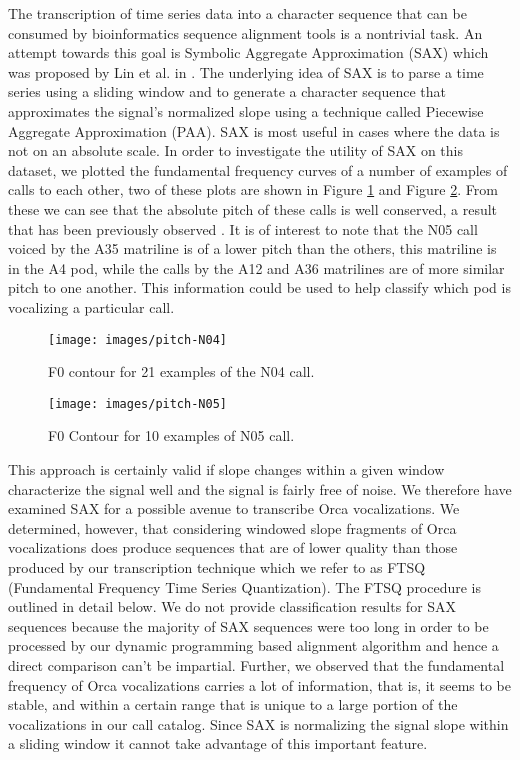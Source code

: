 The transcription of time series data into a character sequence that
can be consumed by bioinformatics sequence alignment tools is a
nontrivial task.  An attempt towards this goal is Symbolic Aggregate
Approximation (SAX) which was proposed by Lin et al. in
\cite{Lin2003}. The underlying idea of SAX is to parse a time series
using a sliding window and to generate a character sequence that
approximates the signal's normalized slope using a technique called
Piecewise Aggregate Approximation (PAA).  SAX is most useful in cases
where the data is not on an absolute scale.  In order to investigate
the utility of SAX on this dataset, we plotted the fundamental
frequency curves of a number of examples of calls to each other, two
of these plots are shown in Figure \ref{fig:pitch-N04} and Figure
\ref{fig:pitch-N05}.  From these we can see that the absolute pitch of
these calls is well conserved, a result that has been previously
observed \cite{ford87}.  It is of interest to note that the N05 call
voiced by the A35 matriline is of a lower pitch than the others, this
matriline is in the A4 pod, while the calls by the A12 and A36
matrilines are of more similar pitch to one another.  This information
could be used to help classify which pod is vocalizing a particular
call.

\begin{figure}[h]
\centering
\texttt{[image: images/pitch-N04]}
\caption{F0 contour for 21 examples of the N04 call.}
\label{fig:pitch-N04}
\end{figure}

\begin{figure}[h]
\centering
\texttt{[image: images/pitch-N05]}
\caption{F0 Contour for 10 examples of N05 call.}
\label{fig:pitch-N05}
\end{figure}

This approach is certainly valid if slope changes within a given
window characterize the signal well and the signal is fairly free of
noise. We therefore have examined SAX for a possible avenue to
transcribe Orca vocalizations. We determined, however, that
considering windowed slope fragments of Orca vocalizations does
produce sequences that are of lower quality than those produced by our
transcription technique which we refer to as FTSQ (Fundamental
Frequency Time Series Quantization).  The FTSQ procedure is outlined
in detail below. We do not provide classification results for SAX
sequences because the majority of SAX sequences were too long in order
to be processed by our dynamic programming based alignment algorithm
and hence a direct comparison can't be impartial. Further, we observed
that the fundamental frequency of Orca vocalizations carries a lot of
information, that is, it seems to be stable, and within a certain
range that is unique to a large portion of the vocalizations in our call
catalog. Since SAX is normalizing the signal slope within a sliding
window it cannot take advantage of this important feature.

